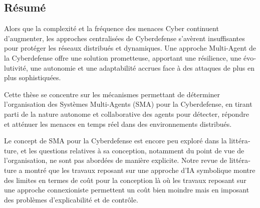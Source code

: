 \begingroup
\let\clearpage\relax
\let\cleardoublepage\relax
\let\cleardoublepage\relax

\begin{otherlanguage}{ngerman}
    \chapter*{Résumé}

    Alors que la complexité et la fréquence des menaces Cyber continuent d'augmenter, les approches centralisées de Cyberdefense s'avèrent insuffisantes pour protéger les réseaux distribués et dynamiques. Une approche Multi-Agent de la Cyberdefense offre une solution prometteuse, apportant une résilience, une évolutivité, une autonomie et une adaptabilité accrues face à des attaques de plus en plus sophistiquées.

    Cette thèse se concentre sur les mécanismes permettant de déterminer l'organisation des Systèmes Multi-Agents (SMA) pour la Cyberdefense, en tirant parti de la nature autonome et collaborative des agents pour détecter, répondre et atténuer les menaces en temps réel dans des environnements distribués.
    
    Le concept de SMA pour la Cyberdefense est encore peu exploré dans la littérature, et les questions relatives à sa conception, notamment du point de vue de l'organisation, ne sont pas abordées de manière explicite. Notre revue de littérature a montré que les travaux reposant sur une approche d'IA symbolique montre des limites en termes de coût pour la conception là où les travaux reposant sur une approche connexioniste permettent un coût bien moindre mais en imposant des problèmes d'explicabilité et de contrôle.


\end{otherlanguage}
